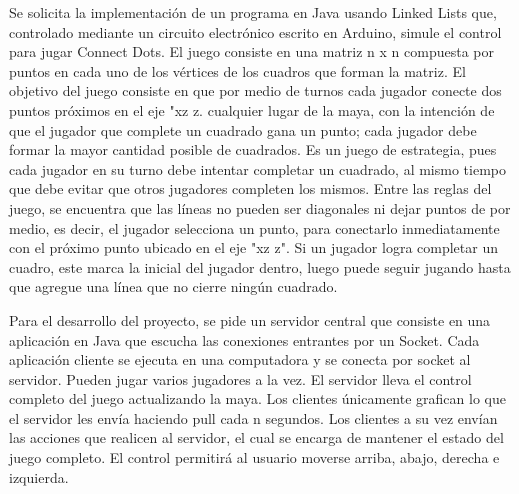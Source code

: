 \documentclass[12pt, letterpaper, twoside]{article}
\begin{document}
	\begin{flushleft}
		Se solicita la implementación de un programa en Java usando Linked Lists que, controlado mediante un circuito electrónico escrito en Arduino, simule el control para jugar Connect Dots. El juego consiste en una matriz n x n compuesta por puntos en cada uno de los vértices de los cuadros que forman la matriz. El objetivo del juego consiste en que por medio de turnos cada jugador conecte dos puntos próximos en el eje "xz z. cualquier lugar de la maya, con la intención de que el jugador que complete un cuadrado gana un punto; cada jugador debe formar la mayor cantidad posible de cuadrados. Es un juego de estrategia, pues cada jugador en su turno debe intentar completar un cuadrado, al mismo tiempo que debe evitar que otros jugadores completen los mismos. Entre las reglas del juego, se encuentra que las líneas no pueden ser diagonales ni dejar puntos de por medio, es decir, el jugador selecciona un punto, para conectarlo inmediatamente con el próximo punto ubicado en el eje "xz z". Si un jugador logra completar un cuadro, este marca la inicial del jugador dentro, luego puede seguir jugando hasta que agregue una línea que no cierre ningún cuadrado. 
		
		Para el desarrollo del proyecto, se pide un servidor central que consiste en una aplicación en Java que escucha las conexiones entrantes por un Socket. Cada aplicación cliente se ejecuta en una computadora y se conecta por socket al servidor. Pueden jugar varios jugadores a la vez. El servidor lleva el control completo del juego actualizando la maya. Los clientes únicamente grafican lo que el servidor les envía haciendo pull cada n segundos. Los clientes a su vez envían las acciones que realicen al servidor, el cual se encarga de mantener el estado del juego completo. El control permitirá al usuario moverse arriba, abajo, derecha e izquierda.
	\end{flushleft}
	
\end{document}
